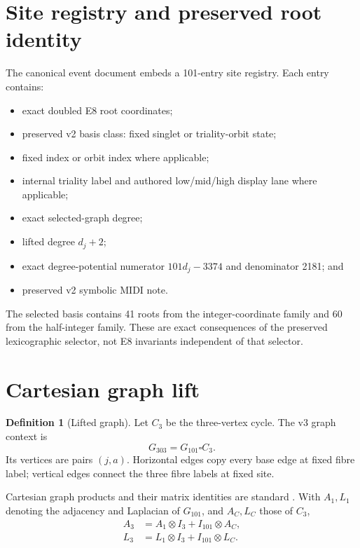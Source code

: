 \documentclass[11pt,a4paper]{article}
\theoremstyle{definition}
\newtheorem{definition}[theorem]{Definition}
\newcommand{\Gone}{G_{101}}
\newcommand{\Gthree}{G_{303}}
\begin{document}
\section{Site registry and preserved root identity}
The canonical event document embeds a 101-entry site registry. Each entry contains:
\begin{itemize}
\item exact doubled E8 root coordinates;
\item preserved v2 basis class: fixed singlet or triality-orbit state;
\item fixed index or orbit index where applicable;
\item internal triality label and authored low/mid/high display lane where applicable;
\item exact selected-graph degree;
\item lifted degree $d_j+2$;
\item exact degree-potential numerator $101d_j-3374$ and denominator 2181; and
\item preserved v2 symbolic MIDI note.
\end{itemize}
The selected basis contains 41 roots from the integer-coordinate family and 60 from the half-integer family. These are exact consequences of the preserved lexicographic selector, not E8 invariants independent of that selector.

\section{Cartesian graph lift}
\begin{definition}[Lifted graph]
Let $C_3$ be the three-vertex cycle. The v3 graph context is
\begin{equation}
\boxed{\Gthree=\Gone\square C_3.}
\end{equation}
Its vertices are pairs $(j,a)$. Horizontal edges copy every base edge at fixed fibre label; vertical edges connect the three fibre labels at fixed site.
\end{definition}

Cartesian graph products and their matrix identities are standard \cite{hammack2011product}. With $A_1,L_1$ denoting the adjacency and Laplacian of $\Gone$, and $A_C,L_C$ those of $C_3$,
\begin{align}
A_3&=A_1\otimes I_3+I_{101}\otimes A_C,\\
L_3&=L_1\otimes I_3+I_{101}\otimes L_C.
\end{align}
\end{document}

